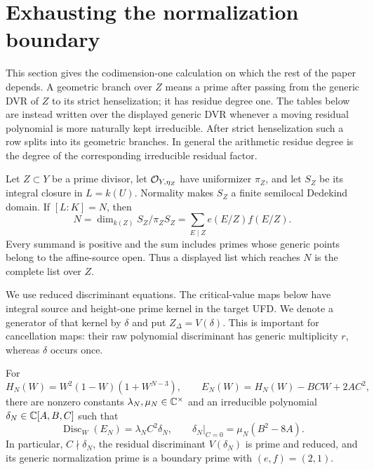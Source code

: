 \section{Exhausting the normalization boundary}

This section gives the codimension-one calculation on which the rest of the
paper depends.  A geometric branch over $Z$ means a prime after passing from
the generic DVR of $Z$ to its strict henselization; it has residue degree one.
The tables below are instead written over the displayed generic DVR whenever
a moving residual polynomial is more naturally kept irreducible.  After
strict henselization such a row splits into its geometric branches.  In
general the arithmetic residue degree is the degree of the corresponding
irreducible residual factor.

Let $Z\subset Y$ be a prime divisor, let
${\cal O}_{Y,\eta_Z}$ have uniformizer $\pi_Z$, and let $S_Z$ be its integral
closure in $L=k(U)$.  Normality makes $S_Z$ a finite semilocal Dedekind
domain.  If $[L:K]=N$, then
\[
 N=\dim_{k(Z)}S_Z/\pi_ZS_Z
  =\sum_{E\mid Z}e(E/Z)f(E/Z).                            \tag{4.1}
\]
Every summand is positive and the sum includes primes whose generic points
belong to the affine-source open.  Thus a displayed list which reaches $N$
is the complete list over $Z$.

We use reduced discriminant equations.  The critical-value maps below have
integral source and height-one prime kernel in the target UFD.  We denote a
generator of that kernel by $\delta$ and put $Z_\Delta=V(\delta)$.  This is
important for cancellation maps: their raw polynomial discriminant has
generic multiplicity $r$, whereas $\delta$ occurs once.

\begin{lemma}
\label{lem:weighted-saturation}
For
\[
 H_N(W)=W^2(1-W)(1+W^{N-3}),\qquad
 E_N(W)=H_N(W)-BCW+2AC^2,
\]
there are nonzero constants $\lambda_N,\mu_N\in\mathbb C^\times$ and an
irreducible polynomial $\delta_N\in\mathbb C[A,B,C]$ such that
\[
 \operatorname{Disc}_W(E_N)=\lambda_N C^2\delta_N,
 \qquad
 \delta_N|_{C=0}=\mu_N(B^2-8A).                         \tag{4.1a}
\]
In particular, $C\nmid\delta_N$, the residual discriminant
$V(\delta_N)$ is prime and reduced, and its generic normalization prime is a
boundary prime with $(e,f)=(2,1)$.
\end{lemma}

